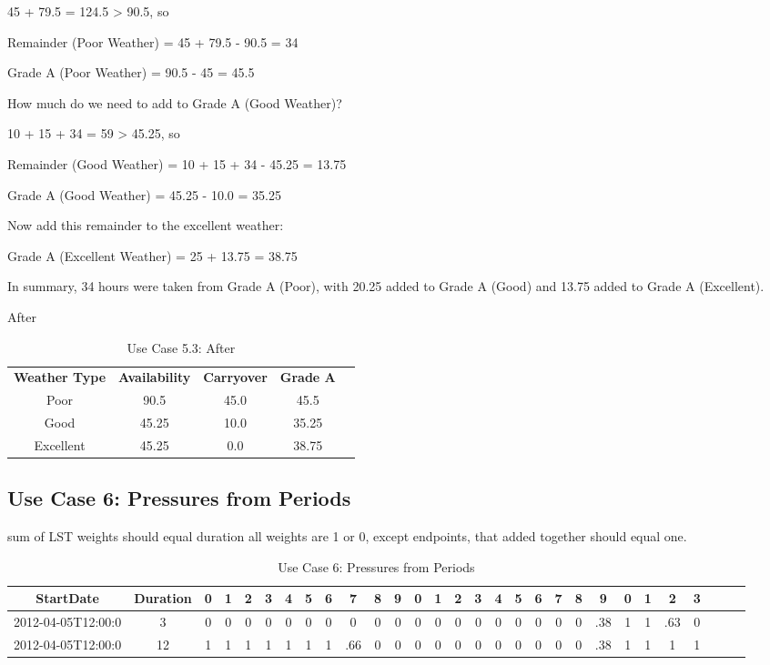 \documentclass{article}
\begin{document}
45 + 79.5 = 124.5 > 90.5, so

Remainder (Poor Weather) = 45 + 79.5 - 90.5 = 34

Grade A (Poor Weather) = 90.5 - 45 = 45.5

How much do we need to add to Grade A (Good Weather)?

10 + 15 + 34 = 59 > 45.25, so

Remainder (Good Weather) = 10 + 15 + 34 - 45.25 = 13.75

Grade A (Good Weather) = 45.25 - 10.0 = 35.25

Now add this remainder to the excellent weather:

Grade A (Excellent Weather) = 25 + 13.75 = 38.75

In summary, 34 hours were taken from Grade A (Poor), with 20.25 added to Grade A (Good) and 13.75 added to Grade A (Excellent).

After
\begin{table}
{\footnotesize
\caption{Use Case 5.3: After\label{tab:time}}
\begin{tabular*}{1.05\textwidth}{@{\extracolsep{\fill}}ccccc}
\hline \hline
{\bf Weather Type} & {\bf Availability} & {\bf Carryover} & {\bf Grade A}\\
Poor & 90.5 & 45.0 & 45.5\\
Good & 45.25 & 10.0 & 35.25\\
Excellent & 45.25 & 0.0 & 38.75\\ 
\hline \hline
\end{tabular*}
}
\end{table}


\subsection{Use Case 6: Pressures from Periods}

    sum of LST weights should equal duration
    all weights are 1 or 0, except endpoints, that added together should equal one. 

\begin{table}
{\tiny
\caption{Use Case 6: Pressures from Periods\label{tab:time}}
\begin{tabular*}{1.05\textwidth}{@{\extracolsep{\fill}}ccccccccccccccccccccccccccccc}
\hline \hline
{\bf StartDate} & {\bf Duration} & {\bf 0} & {\bf 1} & {\bf 2} & {\bf 3} & {\bf 4} & {\bf 5} & {\bf 6} & {\bf 7} & {\bf 8} & {\bf 9} & {\bf 0} & {\bf 1} & {\bf 2} & {\bf 3} & {\bf 4} & {\bf 5} & {\bf 6} & {\bf 7} & {\bf 8} & {\bf 9} & {\bf 0} & {\bf 1} & {\bf 2} & {\bf 3}\\
\hline
2012-04-05T12:00:0 & 3 & 0 & 0 & 0 & 0 & 0 & 0 & 0 & 0 & 0 & 0 & 0 & 0 & 0 & 0 & 0 & 0 & 0 & 0 & 0 & .38 & 1 & 1 & .63 & 0\\
2012-04-05T12:00:0 & 12 & 1 & 1 & 1 & 1 & 1 & 1 & 1 & .66 & 0 & 0 & 0 & 0 & 0 & 0 & 0 & 0 & 0 & 0 & 0 & .38 & 1 & 1 & 1 & 1\\
\hline \hline
\end{tabular*}
}
\end{table}
\end{document}
